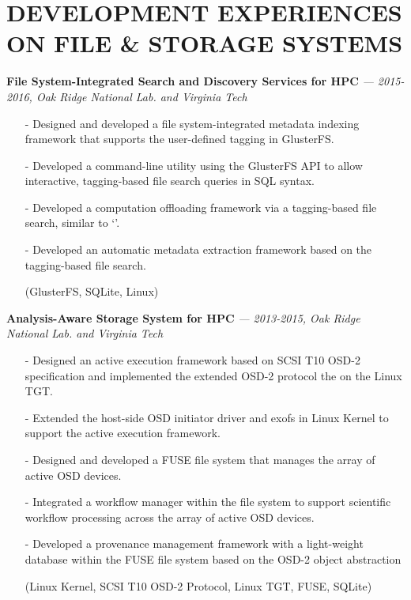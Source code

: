 \section{DEVELOPMENT EXPERIENCES ON FILE \& STORAGE SYSTEMS} 
\vspace{0.03in}
  {\bf File System-Integrated Search and Discovery Services for HPC}
   {\it \footnotesize --- 2015-2016, Oak Ridge National Lab. and Virginia Tech}
   \begin{itemize}[leftmargin=*]
    \setlength\itemsep{-0.02in}
    \item[-] Designed and developed a file system-integrated metadata indexing framework
	     that supports the user-defined tagging in GlusterFS.
    \item[-] Developed a command-line utility using the GlusterFS API to
             allow interactive, tagging-based file search queries in SQL syntax.
    \item[-] Developed a computation offloading framework via a tagging-based file search,
             similar to `'.
    \item[-] Developed an automatic metadata
	     extraction framework based on the tagging-based file search.
    \item[] {\small(GlusterFS, SQLite, Linux)}
   \end{itemize}
  \vspace{-0.15in}
  {\bf Analysis-Aware Storage System for HPC}
    {\it \footnotesize --- 2013-2015, Oak Ridge National Lab. and Virginia Tech}
    \begin{itemize}[leftmargin=*]
    \setlength\itemsep{-0.02in}
    \item[-] Designed an active execution framework based on SCSI T10 OSD-2 specification
             and implemented the extended OSD-2 protocol the on the Linux TGT.
    \item[-] Extended the host-side OSD initiator driver and exofs in Linux Kernel
             to support the active execution framework.
    \item[-] Designed and developed a FUSE file system that manages
             the array of active OSD devices.
    \item[-] Integrated a workflow manager within the file system to support scientific
             workflow processing across the array of active OSD devices.
    \item[-] Developed a provenance management framework
             with a light-weight database within the FUSE file system
             based on the OSD-2 object abstraction
    \item[] {\small(Linux Kernel, SCSI T10 OSD-2 Protocol, Linux TGT, FUSE, SQLite)}
    \end{itemize}
